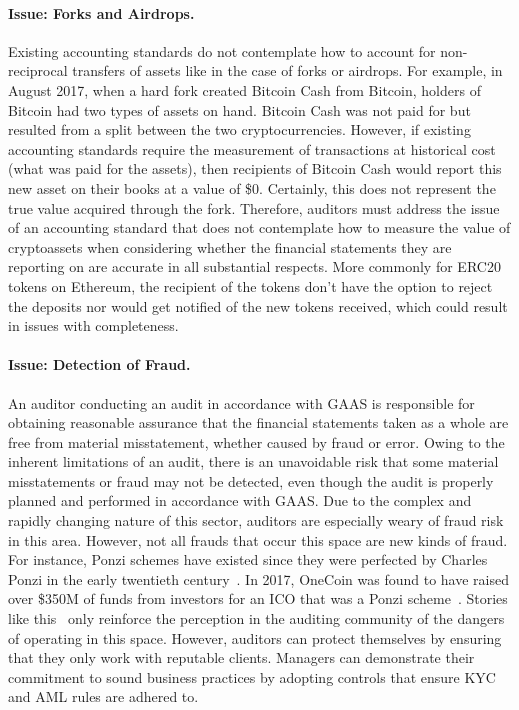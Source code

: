 \paragraph{Issue: Forks and Airdrops.} Existing accounting standards do not contemplate how to account for non-reciprocal transfers of assets like in the case of forks or airdrops. For example, in August 2017, when a hard fork created Bitcoin Cash from Bitcoin, holders of Bitcoin had two types of assets on hand. Bitcoin Cash was not paid for but resulted from a split between the two cryptocurrencies. However, if existing accounting standards require the measurement of transactions at historical cost (what was paid for the assets), then recipients of Bitcoin Cash would report this new asset on their books at a value of \$0. Certainly, this does not represent the true value acquired through the fork. Therefore, auditors must address the issue of an accounting standard that does not contemplate how to measure the value of cryptoassets when considering whether the financial statements they are reporting on are accurate in all substantial respects. More commonly for ERC20 tokens on Ethereum, the recipient of the tokens don{'}t have the option to reject the deposits nor would get notified of the new tokens received, which could result in issues with completeness. 

\paragraph{Issue: Detection of Fraud.} An auditor conducting an audit in accordance with GAAS is responsible for obtaining reasonable assurance that the financial statements taken as a whole are free from material misstatement, whether caused by fraud or error. Owing to the inherent limitations of an audit, there is an unavoidable risk that some material misstatements or fraud may not be detected, even though the audit is properly planned and performed in accordance with GAAS. Due to the complex and rapidly changing nature of this sector, auditors are especially weary of fraud risk in this area. 
However, not all frauds that occur this space are new kinds of fraud. For instance, Ponzi schemes have existed since they were perfected by Charles Ponzi in the early twentieth century~\cite{ponzi2001rise}. In 2017, OneCoin was found to have raised over \$350M of funds from investors for an ICO that was a Ponzi scheme~\cite{atlanticCryptoPonzi2017}. Stories like this~\cite{vasek2015analyzing} only reinforce the perception in the auditing community of the dangers of operating in this space. However, auditors can protect themselves by ensuring that they only work with reputable clients. Managers can demonstrate their commitment to sound business practices by adopting controls that ensure KYC and AML rules are adhered to.

